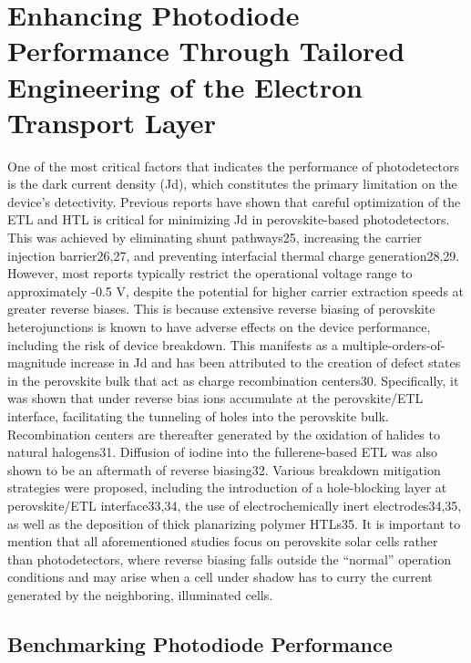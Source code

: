 \chapter{Enhancing Photodiode Performance Through Tailored Engineering of the Electron Transport Layer}\label{ch:transport_layer}


One of the most critical factors that indicates the performance of photodetectors is the dark current density (Jd), which constitutes the primary limitation on the device’s detectivity. Previous reports have shown that careful optimization of the ETL and HTL is critical for minimizing Jd in perovskite-based photodetectors. This was achieved by eliminating shunt pathways25, increasing the carrier injection barrier26,27, and preventing interfacial thermal charge generation28,29. However, most reports typically restrict the operational voltage range to approximately -0.5 V, despite the potential for higher carrier extraction speeds at greater reverse biases. This is because extensive reverse biasing of perovskite heterojunctions is known to have adverse effects on the device performance, including the risk of device breakdown. This manifests as a multiple-orders-of-magnitude increase in Jd and has been attributed to the creation of defect states in the perovskite bulk that act as charge recombination centers30. Specifically, it was shown that under reverse bias ions accumulate at the perovskite/ETL interface, facilitating the tunneling of holes into the perovskite bulk. Recombination centers are thereafter generated by the oxidation of halides to natural halogens31. Diffusion of iodine into the fullerene-based ETL was also shown to be an aftermath of reverse biasing32. Various breakdown mitigation strategies were proposed, including the introduction of a hole-blocking layer at perovskite/ETL interface33,34, the use of electrochemically inert electrodes34,35, as well as the deposition of thick planarizing polymer HTLs35. It is important to mention that all aforementioned studies focus on perovskite solar cells rather than photodetectors, where reverse biasing falls outside the “normal” operation conditions and may arise when a cell under shadow has to curry the current generated by the neighboring, illuminated cells.

\section{Benchmarking Photodiode Performance}

